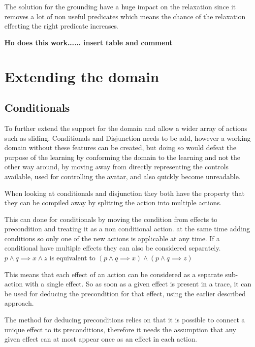 The solution for the grounding have a huge impact on the relaxation since it removes a lot of non useful predicates which means the chance of the relaxation effecting the right predicate increases.
 
 
 \textbf{\huge Ho does this work...... insert table and comment}

\section{Extending the domain}
\subsection{Conditionals}	

	To further extend the support for the domain and allow a wider array of actions such as sliding. Conditionals and Disjunction needs to be add, however a working domain without these features can be created, but doing so would defeat the purpose of the learning by conforming the domain to the learning and not the other way around, by moving away from directly representing the controls available, used for controlling the avatar, and also quickly become unreadable.

	When looking at conditionals and disjunction they both have the property that they can be compiled away by splitting the action into multiple actions. %
	
	This can done for conditionals by moving the condition from effects to precondition and treating it as a non conditional action. at the same time adding conditions so only one of the new actions is applicable at any time. If a conditional have multiple effects they can also be considered separately.
	$p \land q \implies x \land z$
	is equivalent to 
	$(p \land q \implies x)
	\land
	(p \land q \implies z)$
	
	
	This means that each effect of an action can be considered as a separate sub-action with a single effect. So as soon as a given effect is present in a trace, it can be used for deducing the precondition for that effect, using the earlier described approach. 
	
	The method for deducing preconditions relies on that it is possible to connect a unique effect to its preconditions, therefore it needs the assumption that any given effect can at most appear once as an effect in each action.
	
